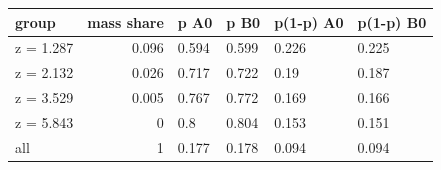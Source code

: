 \begingroup\small
\setlength{\tabcolsep}{3pt}
\renewcommand{\arraystretch}{1.04}
\begin{tabularx}{\linewidth}{XrXXXX}
\toprule
group & mass share & p A0 & p B0 & p(1-p) A0 & p(1-p) B0 \\
\midrule
z = 1.287 & 0.096 & 0.594 & 0.599 & 0.226 & 0.225 \\
z = 2.132 & 0.026 & 0.717 & 0.722 & 0.19 & 0.187 \\
z = 3.529 & 0.005 & 0.767 & 0.772 & 0.169 & 0.166 \\
z = 5.843 & 0 & 0.8 & 0.804 & 0.153 & 0.151 \\
all & 1 & 0.177 & 0.178 & 0.094 & 0.094 \\
\bottomrule
\end{tabularx}
\endgroup
